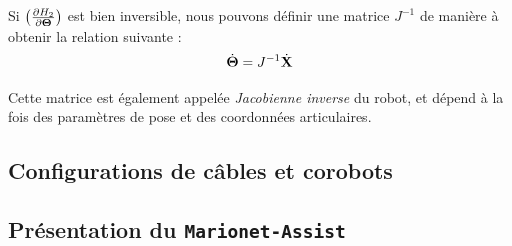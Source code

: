 Si $\left ( \frac{\partial H_2}{\partial {\bf \Theta}} \right )$ est bien inversible, nous pouvons définir une matrice $J^{-1}$ de manière à obtenir la relation suivante :
\begin{equation}
\dot {\bf \Theta} = J^{-1} \dot {\bf X}
\label{intro:eq11}
\end{equation}

Cette matrice est également appelée {\it Jacobienne inverse} du robot, et dépend à la fois des paramètres de pose et des coordonnées articulaires.


\subsection{Configurations de câbles et corobots}



\subsection{Présentation du {\tt Marionet-Assist}}
